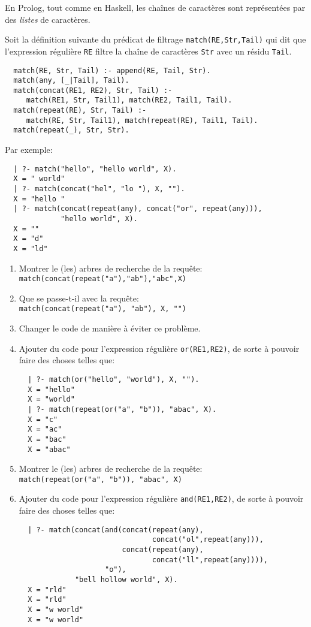 \begin{Exercise}
En Prolog, tout comme en Haskell, les chaînes de caractères sont
représentées par des \emph{listes} de caractères.

Soit la définition suivante du prédicat de filtrage
\verb+match(RE,Str,Tail)+ qui dit que l'expression régulière \texttt{RE}
filtre la chaîne de caractères \texttt{Str} avec un résidu \texttt{Tail}.

\begin{verbatim}
  match(RE, Str, Tail) :- append(RE, Tail, Str).
  match(any, [_|Tail], Tail).
  match(concat(RE1, RE2), Str, Tail) :-
     match(RE1, Str, Tail1), match(RE2, Tail1, Tail).
  match(repeat(RE), Str, Tail) :-
     match(RE, Str, Tail1), match(repeat(RE), Tail1, Tail).
  match(repeat(_), Str, Str).
\end{verbatim}
Par exemple:
\begin{verbatim}
  | ?- match("hello", "hello world", X).
  X = " world"
  | ?- match(concat("hel", "lo "), X, "").
  X = "hello "
  | ?- match(concat(repeat(any), concat("or", repeat(any))),
             "hello world", X).
  X = ""
  X = "d"
  X = "ld"
\end{verbatim}

\begin{enumerate}
\item Montrer le (les) arbres de recherche de la requête: \\
  \verb+match(concat(repeat("a"),"ab"),"abc",X)+
\item Que se passe-t-il avec la requête: \\
  \verb+match(concat(repeat("a"), "ab"), X, "")+
\item Changer le code de manière à éviter ce problème.
\item Ajouter du code pour l'expression régulière \texttt{or(RE1,RE2)}, de
  sorte à pouvoir faire des choses telles que:
\begin{verbatim}
  | ?- match(or("hello", "world"), X, "").
  X = "hello"
  X = "world"
  | ?- match(repeat(or("a", "b")), "abac", X).
  X = "c"
  X = "ac"
  X = "bac"
  X = "abac"
\end{verbatim}
\item Montrer le (les) arbres de recherche de la requête: \\
  \verb+match(repeat(or("a", "b")), "abac", X)+
\item Ajouter du code pour l'expression régulière \texttt{and(RE1,RE2)}, de
  sorte à pouvoir faire des choses telles que:
\begin{verbatim}
  | ?- match(concat(and(concat(repeat(any),
                               concat("ol",repeat(any))),
                        concat(repeat(any),
                               concat("ll",repeat(any)))),
                    "o"),
             "bell hollow world", X).
  X = "rld"
  X = "rld"
  X = "w world"
  X = "w world"
\end{verbatim}

\end{enumerate}
\end{Exercise}